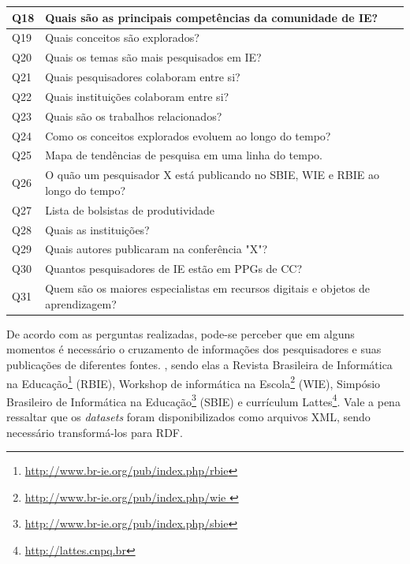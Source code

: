 \begin{table}[!ht]
\begin{tabular}{|l|l|}
		Q18 & Quais são as principais competências da comunidade de IE?                         \\ \hline
		Q19 & Quais conceitos são explorados?                                                   \\ \hline
		Q20 & Quais os temas são mais pesquisados em IE?                                        \\ \hline
		Q21 & Quais pesquisadores colaboram entre si?                                           \\ \hline
		Q22 & Quais instituições colaboram entre si?                                            \\ \hline
		Q23 & Quais são os trabalhos relacionados?                                              \\ \hline
		Q24 & Como os conceitos explorados evoluem ao longo do tempo?                           \\ \hline
		Q25 & Mapa de tendências de pesquisa em uma linha do tempo.                             \\ \hline
		Q26 & O quão um pesquisador X está publicando no SBIE, WIE e RBIE ao longo do tempo?    \\ \hline
		Q27 & Lista de bolsistas de produtividade                                               \\ \hline
		Q28 & Quais as instituições?                                                            \\ \hline
		Q29 & Quais autores publicaram na conferência "X"?                                      \\ \hline
		Q30 & Quantos pesquisadores de IE estão em PPGs de CC?                                  \\ \hline
		Q31 & Quem são os maiores especialistas em recursos digitais e objetos de aprendizagem? \\ \hline
	\end{tabular}
\end{table}

De acordo com as perguntas realizadas, pode-se perceber que em alguns momentos é necessário o cruzamento de informações dos pesquisadores e suas publicações de diferentes fontes. , sendo elas a Revista Brasileira de Informática na Educação\footnote{\url{http://www.br-ie.org/pub/index.php/rbie}} (RBIE), Workshop de informática na Escola\footnote{\url{http://www.br-ie.org/pub/index.php/wie }} (WIE), Simpósio Brasileiro de Informática na Educação\footnote{\url{http://www.br-ie.org/pub/index.php/sbie}} (SBIE) e currículum Lattes\footnote{\url{http://lattes.cnpq.br}}. Vale a pena ressaltar que os \textit{datasets} foram disponibilizados como arquivos XML, sendo necessário transformá-los para RDF.

